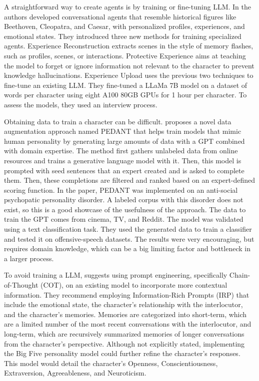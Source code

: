\documentclass[fleqn,moreauthors,10pt]{ds_report}
\begin{document}
A straightforward way to create agents is by training or fine-tuning LLM. In \cite{shao2023characterllm} the authors developed conversational agents that resemble historical figures like Beethoven, Cleopatra, and Caesar, with personalized profiles, experiences, and emotional states. They introduced three new methods for training specialized agents. Experience Reconstruction extracts scenes in the style of memory flashes, such as profiles, scenes, or interactions. Protective Experience aims at teaching the model to forget or ignore information not relevant to the character to prevent knowledge hallucinations. Experience Upload uses the previous two techniques to fine-tune an existing LLM. They fine-tuned a LLaMa 7B model \cite{touvron2023llama} on a dataset of  words per character using eight A100 80GB GPUs for 1 hour per character. To assess the models, they used an interview process.

Obtaining data to train a character can be difficult.
\cite{neuman2023data} proposes a novel data augmentation approach named PEDANT that helps train models that mimic human personality by generating large amounts of data with a GPT combined with domain expertise.
The method first gathers unlabeled data from online resources and trains a generative language model with it.
Then, this model is prompted with seed sentences that an expert created and is asked to complete them.
Then, these completions are filtered and ranked based on an expert-defined scoring function.
In the paper, PEDANT was implemented on an anti-social psychopatic personality disorder.
A labeled corpus with this disorder does not exist, so this is a good showcase of the usefulness of the approach.
The data to train the GPT comes from cinema, TV, and Reddit.
The model was validated using a text classification task.
They used the generated data to train a classifier and tested it on offensive-speech datasets.
The results were very encouraging, but requires domain knowledge, which can be a big limiting factor and bottleneck in a larger process.

To avoid training a LLM, \cite{jeong2023chatbot} suggests using prompt engineering, specifically Chain-of-Thought (COT), on an existing model to incorporate more contextual information. They recommend employing Information-Rich Prompts (IRP) that include the emotional state, the character's relationship with the interlocutor, and the character's memories. Memories are categorized into short-term, which are a limited number of the most recent conversations with the interlocutor, and long-term, which are recursively summarized memories of longer conversations from the character's perspective. Although not explicitly stated, implementing the Big Five personality model \cite{goldberg1990thebigfive} could further refine the character's responses. This model would detail the character's Openness, Conscientiousness, Extraversion, Agreeableness, and Neuroticism.
\end{document}
